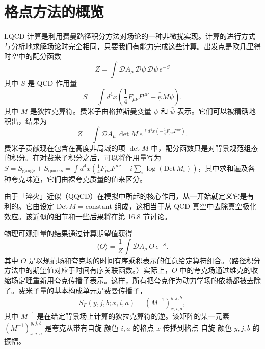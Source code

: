 \chapter{格点方法的概览}

LQCD 计算是利用费曼路径积分方法对场论的一种非微扰实现。计算的进行方式与分析地求解场论时完全相同，只要我们有能力完成这些计算。出发点是欧几里得时空中的配分函数
\begin{equation}
  Z = \int \mathcal{D}A_\mu\, \mathcal{D}\bar{\psi}\, \mathcal{D}\psi\, e^{-S}
  \label{eq:partition}
\end{equation}
其中 $S$ 是 QCD 作用量
\begin{equation}
  S = \int d^4x \left( \frac{1}{4} F_{\mu\nu}F^{\mu\nu} - \bar{\psi} M \psi \right).
  \label{eq:qcd_action}
\end{equation}
其中 $M$ 是狄拉克算符。费米子由格拉斯曼变量 $\psi$ 和 $\bar{\psi}$ 表示。它们可以被精确地积出，结果为
\begin{equation}
  Z = \int \mathcal{D}A_\mu\, \det M\, e^{\int d^4x \left(-\frac{1}{4} F_{\mu\nu}F^{\mu\nu}\right)}.
  \label{eq:partition_det}
\end{equation}
费米子贡献现在包含在高度非局域的项 $\det M$ 中，配分函数只是对背景规范组态的积分。在对费米子积分之后，可以将作用量写为 $S = S_\mathrm{gauge} + S_\mathrm{quarks} = \int d^4x ( \frac{1}{4} F_{\mu\nu}F^{\mu\nu} - i \sum_i \log(\mathrm{Det}\,M_i) )$，其中求和遍及各种夸克味道，它们由裸夸克质量的值来区分。

由于「淬火」近似（QQCD）在模拟中所起的核心作用，从一开始就定义它是有利的。它由设定 $\mathrm{Det}\,M = \mathrm{constant}$ 组成，这相当于从 QCD 真空中去除真空极化效应。该近似的细节和一些后果将在第 16.8 节讨论。

物理可观测量的结果通过计算期望值获得
\begin{equation}
  \langle O \rangle = \frac{1}{Z} \int \mathcal{D}A_\mu\, O\, e^{-S}.
  \label{eq:expectation}
\end{equation}
其中 $O$ 是以规范场和夸克场的时间有序乘积表示的任意给定算符组合。（路径积分方法中的期望值对应于时间有序关联函数。）实际上，$O$ 中的夸克场通过维克的收缩场定理重新用夸克传播子表示。这样，所有把夸克作为动力学场的依赖都被去除了。费米子量的基本构成单元是费曼传播子，
\begin{equation}
  S_F(y, j, b; x, i, a) = \left( M^{-1} \right)^{y,j,b}_{x,i,a},
  \label{eq:feynman_propagator}
\end{equation}
其中 $M^{-1}$ 是在给定背景场上计算的狄拉克算符的逆。该矩阵的某一元素 $\left( M^{-1} \right)^{y,j,b}_{x,i,a}$ 是夸克从带有自旋-颜色 $i, a$ 的格点 $x$ 传播到格点-自旋-颜色 $y, j, b$ 的振幅。

